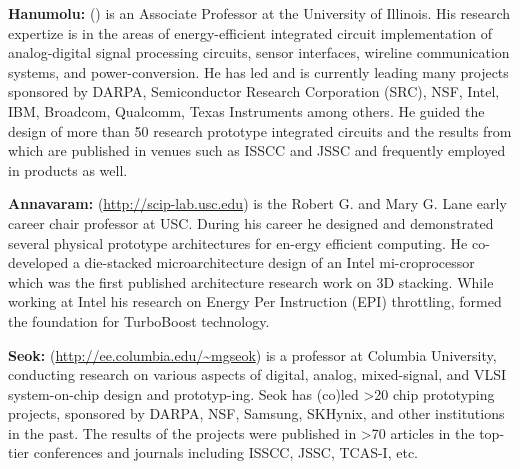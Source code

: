 \noindent
\textbf{Hanumolu:} (\url{}) is an Associate Professor at the University of Illinois. 
His research expertize is in the areas of energy-efficient integrated circuit implementation of analog-digital signal processing circuits, sensor interfaces, wireline communication systems, and power-conversion. 
He has led and is currently leading many projects sponsored by DARPA, Semiconductor Research Corporation (SRC), NSF, Intel, IBM, Broadcom, Qualcomm, Texas Instruments among others. 
He guided the design of more than 50 research prototype integrated circuits and the results from which are published in venues such as ISSCC and JSSC and frequently employed in products as well.   

\noindent
\textbf{Annavaram:} (\url{http://scip-lab.usc.edu}) is the Robert G. and Mary G. Lane early career chair professor at USC. 
During his career he designed and demonstrated several physical prototype architectures for en-ergy efficient computing. 
He co-developed a die-stacked microarchitecture design of an Intel mi-croprocessor which was the first published architecture research work on 3D stacking. 
While working at Intel his research on Energy Per Instruction (EPI) throttling, formed the foundation for TurboBoost technology.

\noindent
\textbf{Seok:} (\url{http://ee.columbia.edu/~mgseok}) is a professor at Columbia University, conducting research on various aspects of digital, analog, mixed-signal, and VLSI system-on-chip design and prototyp-ing. 
Seok has (co)led >20 chip prototyping projects, sponsored by DARPA, NSF, Samsung, SKHynix, and other institutions in the past. 
The results of the projects were published in >70 articles in the top-tier conferences and journals including ISSCC, JSSC, TCAS-I, etc.
